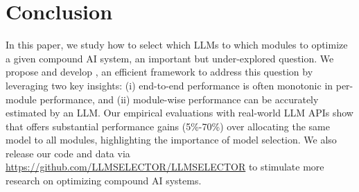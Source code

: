 \section{Conclusion}\label{sec:deluxeagent:Conclusion}
In this paper, we study how to select which LLMs to which modules to optimize a given compound AI system, an important but under-explored question. We propose and develop \deluxesystem{}, an efficient framework to address this question by leveraging two key insights: (i) end-to-end performance is often monotonic in per-module performance, and (ii) module-wise performance can be accurately estimated by an LLM. Our empirical evaluations with real-world LLM APIs show that \deluxesystem{} offers substantial performance gains (5\%-70\%) over allocating the same model to all modules, highlighting the importance of model selection. We also release our code and data via \url{https://github.com/LLMSELECTOR/LLMSELECTOR} to stimulate more research on optimizing compound AI systems.